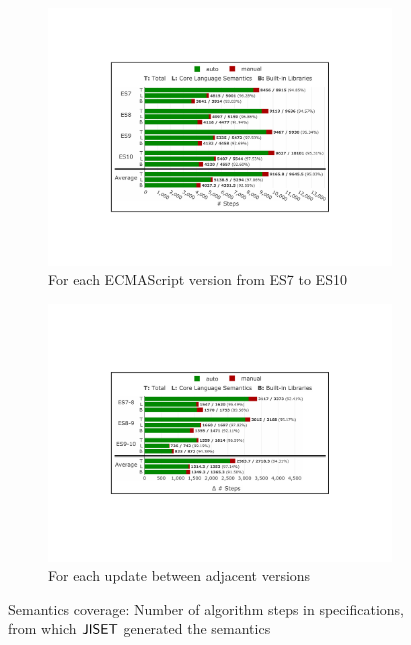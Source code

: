 \begin{figure}[t]
  \centering
  \begin{subfigure}{0.48\textwidth}
    \includegraphics[width=\textwidth]{img/sem-all.pdf}
    \caption{For each ECMAScript version from ES7 to ES10}
    \vspace*{1.5em}
    \label{fig:semantics-all-version}
  \end{subfigure}
  \hfill
  \begin{subfigure}{0.48\textwidth}
    \includegraphics[width=\textwidth]{img/sem-update.pdf}
    \caption{For each update between adjacent versions}
    \label{fig:semantics-all-version-update}
  \end{subfigure}
\vspace*{-.5em}
\caption{Semantics coverage: Number of algorithm steps in specifications,
from which \( \text{\sf JISET} \) generated the semantics}
  \label{fig:all-version}
\vspace*{-0.5em}
\end{figure}

